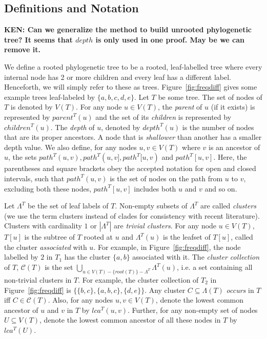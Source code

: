 \documentclass[final,1p,times]{elsarticle}
\newcommand{\leafset}{\Lambda}
\begin{document}
    \subsection{Definitions and Notation}
    \label{subsec:def}

    {\bf KEN: Can we generalize the method to build unrooted phylogenetic tree? It seems that $depth$ is only used in one proof. May be we can remove it.}

    We define a rooted phylogenetic tree to be a rooted, leaf-labelled tree where every internal node has 2 or more children and every leaf has a different label.  Henceforth, we will simply refer to these as trees.  Figure~\ref{fig:freqdiff} gives some example trees leaf-labeled by $\{a, b, c, d, e\}$.  Let $T$ be some tree. The set of nodes of $T$ is denoted by $V(T)$. For any node $u \in V(T)$, the \textit{parent} of $u$ (if it exists) is represented by $parent^T(u)$ and the set of its \textit{children} is represented by $children^T(u)$. The \textit{depth} of $u$, denoted by $depth^T(u)$ is the number of nodes that are its proper ancestors. A node that is \textit{shallower} than another has a smaller depth value. We also define, for any nodes $u, v \in V(T)$ where $v$ is an ancestor of $u$, the sets $path^T(u, v), path^T(u, v], path^T[u, v)$ and $path^T[u, v]$. Here, the parentheses and square brackets obey the accepted notation for open and closed intervals, such that $path^T(u, v)$ is the set of nodes on the path from $u$ to $v$, excluding both these nodes, $path^T[u, v]$ includes both $u$ and $v$ and so on.

    Let $\leafset^T$ be the set of leaf labels of $T$. Non-empty subsets of $\leafset^T$ are called \textit{clusters} (we use the term clusters instead of clades for consistency with recent literature). Clusters with cardinality $1$ or $|\leafset^T|$ are \textit{trivial clusters}. For any node $u \in V(T)$, $T[u]$ is the subtree of $T$ rooted at $u$ and $\leafset^T(u)$ is the leafset of $T[u]$, called the cluster \textit{associated} with $u$. For example, in Figure~\ref{fig:freqdiff}, the node labelled by $2$ in $T_1$ has the cluster $\{a, b\}$ associated with it. The \textit{cluster collection} of $T$, $\mathcal{C}(T)$ is the set $\bigcup_{u \in V(T) - \{root(T)\} - \leafset^T} {\leafset^T(u)}$, i.e. a set containing all non-trivial clusters in $T$. For example, the cluster collection of $T_2$ in Figure~\ref{fig:freqdiff} is $\{\{b, c\}, \{a, b, c\}, \{d, e\}\}$. Any cluster $C \subseteq \leafset(T)$ \textit{occurs} in $T$ iff $C \in \mathcal{C}(T)$. Also, for any nodes $u, v \in V(T)$, denote the lowest common ancestor of $u$ and $v$ in $T$ by $lca^T(u, v)$. Further, for any non-empty set of nodes $U \subseteq V(T)$, denote the lowest common ancestor of all these nodes in $T$ by $lca^T(U)$.
\end{document}
